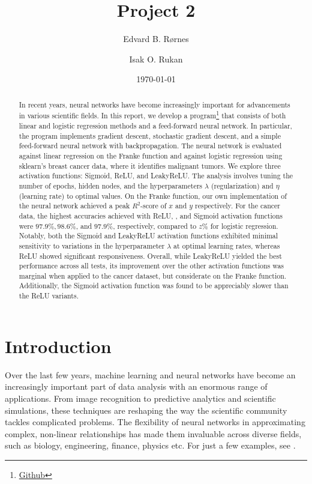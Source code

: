 \documentclass[%
reprint,
amsmath,amssymb,
aps,
]{revtex4-2}
\begin{document}
	
\title{Project 2}
\author{Edvard B. Rørnes}
\author{Isak O. Rukan}
\date{\today}

\begin{abstract}
	In recent years, neural networks have become increasingly important for advancements in various scientific fields. In this report, we develop a program\footnote{\href{https://github.com/EdvardRornes/FYS-STK4155/tree/main/Project1}{Github}} that consists of both linear and logistic regression methods and a feed-forward neural network. In particular, the program implements gradient descent, stochastic gradient descent, and a simple feed-forward neural network with backpropagation. The neural network is evaluated against linear regression on the Franke function and against logistic regression using sklearn's breast cancer data, where it identifies malignant tumors. We explore three activation functions: Sigmoid, ReLU, and LeakyReLU. The analysis involves tuning the number of epochs, hidden nodes, and the hyperparameters $\lambda$ (regularization) and $\eta$ (learning rate) to optimal values. On the Franke function, our own implementation of the neural network achieved a peak $R^2$-score of $x$ and $y$ respectively. For the cancer data, the highest accuracies achieved with ReLU, , and Sigmoid activation functions were $97.9\%, 98.6\%$, and $97.9\%$, respectively, compared to $z\%$ for logistic regression. Notably, both the Sigmoid and LeakyReLU activation functions exhibited minimal sensitivity to variations in the hyperparameter $\lambda$ at optimal learning rates, whereas ReLU showed significant responsiveness. Overall, while LeakyReLU yielded the best performance across all tests, its improvement over the other activation functions was marginal when applied to the cancer dataset, but considerate on the Franke function. Additionally, the Sigmoid activation function was found to be appreciably slower than the ReLU variants.
\end{abstract}

\maketitle

\section{Introduction}
Over the last few years, machine learning and neural networks have become an increasingly important part of data analysis with an enormous range of applications. From image recognition to predictive analytics and scientific simulations, these techniques are reshaping the way the scientific community tackles complicated problems. The flexibility of neural networks in approximating complex, non-linear relationships has made them invaluable across diverse fields, such as biology, engineering, finance, physics etc. For just a few examples, see \cite{dawid2023modernapplicationsmachinelearning,thapar2023applicationsmachinelearningmodelling,mohammadi2022applicationsmachinelearninghealthcare}.
\end{document}

